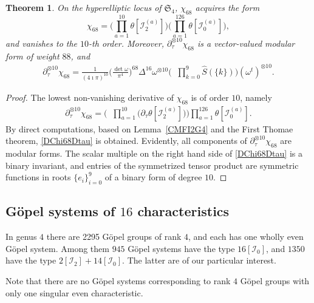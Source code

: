 \documentclass[twoside]{amsart}
\newcommand{\I}{\mathcal{I}}
\DeclareMathOperator{\SymOtimes}{\overset{\mathrm{sym}}{\otimes}}
\newtheorem{theo}{Theorem}[section]
\theoremstyle{definition}
\theoremstyle{plain}
\begin{document}
\begin{theo}
On the hyperelliptic locus of $\mathfrak{S}_4$, $\chi_{68}$ acquires the form
\begin{equation}\label{Chi18}
\chi_{68} = \Big(\prod_{a=1}^{10} \theta[\I_2^{(a)}]\Big)
\Big( \prod_{a=1}^{126} \theta[\I_0^{(a)}] \Big),
\end{equation}
and vanishes to the $10$-th order. Moreover,
 $\partial^{\otimes 10}_{\tau} \chi_{68}$
 is a vector-valued modular form of weight $88$,  and
\begin{gather}\label{DChi68Dtau}
\partial^{\otimes 10}_\tau \chi_{68} = 
\frac{1}{(4\imath \pi)^{10}} \Big(\frac{\det \omega}{\pi^4}\Big)^{68}  
 \Delta^{16} \omega^{\otimes 10} \Big(\SymOtimes \prod_{k=0}^{9} 
\hat{S}(\{k\})  \Big)(\omega^t)^{\otimes 10}.
\end{gather}
\end{theo}
\begin{proof}
The lowest non-vanishing derivative of $\chi_{68}$ is of order $10$, namely
 \begin{gather*}
\partial^{\otimes 10}_\tau \chi_{68} =  \Big(\SymOtimes \prod_{a=1}^{10} 
\big(\partial_\tau  \theta[\I_2^{(a)}]\big) \Big) \prod_{a=1}^{126} \theta[\I_0^{(a)}].
\end{gather*}
By direct computations, based on
Lemma~\ref{CMFI2G4} and the First Thomae theorem, \eqref{DChi68Dtau}
is obtained. 
Evidently, all components of $\partial^{\otimes 10}_\tau \chi_{68}$
are modular forms. 
The scalar multiple on the right hand side of  \eqref{DChi68Dtau} is a binary invariant, 
 and entries of the symmetrized tensor product 
are symmetric functions in roots $\{e_i\}_{i=0}^9$ of a binary form of degree $10$.
\end{proof}


\subsection{G\"{o}pel systems of $16$ characteristics}
In genus $4$ there are 2295  G\"{o}pel groups of rank $4$, and each has one wholly even G\"{o}pel system.
Among them $945$ G\"{o}pel systems have the type $16[\I_0]$,  and $1350$  have the type $2[\I_2]+14[\I_0]$.
The latter are of our particular interest.

Note that there are no G\"{o}pel systems corresponding to 
rank $4$ G\"{o}pel groups with only one singular even
characteristic.
\end{document}
